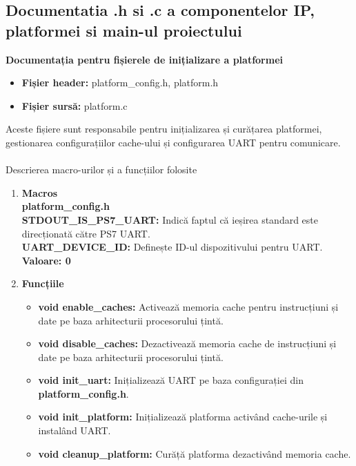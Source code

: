 \documentclass[12pt]{article}
\begin{document}
\subsection{Documentatia .h si .c a componentelor IP, platformei si main-ul proiectului}
\textbf{Documentația pentru fișierele de inițializare a platformei}
 \begin{itemize}
    \item \textbf{Fișier header:} platform\_config.h, platform.h
    \item \textbf{Fișier sursă:} platform.c
 \end{itemize}
\hspace*{1cm}Aceste fișiere sunt responsabile pentru inițializarea și curățarea platformei, gestionarea configurațiilor cache-ului și configurarea UART pentru comunicare.\\\\
\hspace*{1cm}Descrierea macro-urilor și a funcțiilor folosite
\begin{enumerate}
    \item \textbf{Macros}\\
    \hspace*{1cm} \textbf{ platform\_config.h}\\
    \hspace*{1cm} \textbf{STDOUT\_IS\_PS7\_UART:}  Indică faptul că ieșirea standard este direcționată către PS7 UART.\\
    \hspace*{1cm} \textbf{UART\_DEVICE\_ID:}  Definește ID-ul dispozitivului pentru UART.\\
    \hspace*{1cm} \textbf{Valoare: 0}
    \item \textbf{Funcțiile}
        \begin{itemize}
            \item \textbf{void enable\_caches:} Activează memoria cache pentru instrucțiuni și date pe baza arhitecturii procesorului țintă.
            \item \textbf{void disable\_caches:} Dezactivează memoria cache de instrucțiuni și date pe baza arhitecturii procesorului țintă.
            \item \textbf{void init\_uart:} Inițializează UART pe baza configurației din \textbf{platform\_config.h}.
            \item \textbf{void init\_platform:} Inițializează platforma activând cache-urile și instalând UART.
            \item \textbf{void cleanup\_platform:} Curăță platforma dezactivând memoria cache.\\
        \end{itemize}
\end{enumerate}
\end{document}
